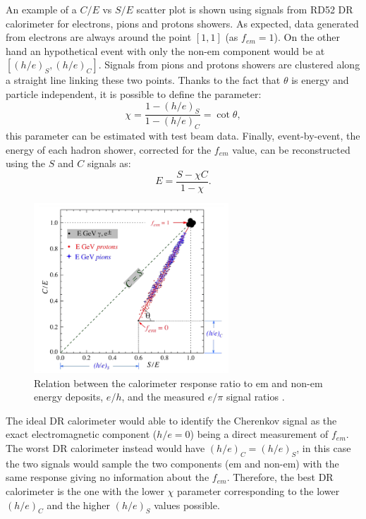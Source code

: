 An example of a $C/E$ vs $S/E$ scatter plot is shown using signals from RD52 DR calorimeter for electrons, pions and protons showers. As expected, data generated from electrons are always around the point $[1,1]$ (as $f_{em} = 1$). On the other hand an hypothetical event with only the non-em component would be at $[(h/e)_S,(h/e)_C]$. Signals from pions and protons showers are clustered along a straight line linking these two points.
Thanks to the fact that $\theta$ is energy and particle independent, it is possible to define the parameter:
\begin{equation}
    \chi = \frac{1-(h/e)_S}{1-(h/e)_C} = \cot{\theta},
\end{equation}
this parameter can be estimated with test beam data.
Finally, event-by-event, the energy of each hadron shower, corrected for the $f_{em}$ value, can be reconstructed using the $S$ and $C$ signals as:
\begin{equation}
    E = \frac{S - \chi C}{1 - \chi}.
\end{equation}

\begin{figure}
	\centering
	\includegraphics[width=0.65\textwidth]{IMG/Cap2/theta_DR.png}
	\caption{Relation between the calorimeter response ratio to em and non-em energy deposits, $e/h$, and the measured $e/\pi$ signal ratios \cite{DR_Theta}.}
	\label{fig:theta_DR}
\end{figure}

The ideal DR calorimeter would able to identify the Cherenkov signal as the exact electromagnetic component ($h/e = 0$) being a direct measurement of $f_{em}$. The worst DR calorimeter instead would have $(h/e)_C = (h/e)_S$, in this case the two signals would sample the two components (em and non-em) with the same response giving no information about the $f_{em}$. Therefore, the best DR calorimeter is the one with the lower $\chi$ parameter corresponding to the lower $(h/e)_C$ and the higher $(h/e)_S$ values possible. 

